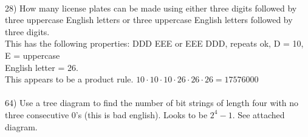 \documentclass{article}
\begin{document}
\begin{flushleft}
~\\
\setlength\parindent{0pt}28) How many license plates can be made using either three digits followed by three uppercase English letters or three uppercase English letters followed by three digits.  \\
\setlength\parindent{24pt}This has the following properties: DDD EEE or EEE DDD, repeats ok, D = 10, E = uppercase \\English letter = 26. \\
\setlength\parindent{24pt}This appears to be a product rule.  $10 \cdot 10 \cdot 10 \cdot 26 \cdot 26 \cdot 26 = 17576000$ \\
~\\
\setlength\parindent{0pt}64) Use a tree diagram to find the number of bit strings of length four with no three consecutive 0's (this is bad english).  Looks to be $2^4 - 1$.  See attached diagram. \\
 
   

\end{flushleft}
\end{document}
